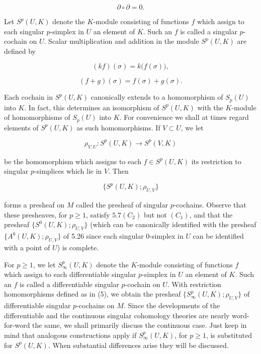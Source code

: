\begin{equation}
\tag{3}\label{eq:5.31:3}
\partial\circ\partial=0.
\end{equation}

Let $S^{p}(U,K)$ denote the $K$-module consisting of functions $f$ which assign to each singular $p$-simplex in $U$ an element of $K$. Such an $f$ is called a singular $p$-cochain on $U$. Scalar multiplication and addition in the module $S^{p}(U,K)$ are defined by

\[
(k f)(\sigma)=k\big(f(\sigma)\big),
\]

\begin{equation}
\tag{4}\label{eq:5.31:4}
(f+g)(\sigma)=f(\sigma)+g(\sigma).
\end{equation}

Each cochain in $S^{p}(U,K)$ canonically extends to a homomorphism of $S_{p}(U)$ into $K$. In fact, this determines an isomorphism of $S^{p}(U,K)$ with the $K$-module of homomorphisms of $S_{p}(U)$ into $K$. For convenience we shall at times regard elements of $S^{p}(U,K)$ as such homomorphisms. If $V\subset U$, we let

\begin{equation}
\tag{5}\label{eq:5.31:5}
\rho_{V,U}\colon S^{p}(U,K)\to S^{p}(V,K)
\end{equation}

be the homomorphism which assigns to each $f \in S^p(U,K)$ its restriction to singular $p$-simplices which lie in $V$. Then

\begin{equation}
\tag{6}\label{eq:5.31:6}
\{S^{p}(U,K);\rho_{U,V}\}
\end{equation}

forms a presheaf on $M$ called the presheaf of singular $p$-cochains. Observe that these presheaves, for $p \geq 1$, satisfy $5.7(C_2)$ but not $(C_1)$, and that the presheaf $\{S^0(U,K);\rho_{U,V}\}$ (which can be canonically identified with the presheaf $\{A^0(U,K);\rho_{U,V}\}$ of 5.26 since each singular 0-simplex in $U$ can be identified with a point of $U$) is complete.

For $p \geq 1$, we let $S_{\infty}^{p}(U,K)$ denote the $K$-module consisting of functions $f$ which assign to each differentiable singular $p$-simplex in $U$ an element of $K$. Such an $f$ is called a differentiable singular $p$-cochain on $U$. With restriction homomorphisms defined as in (5), we obtain the presheaf $\{S_{\infty}^{p}(U,K); \rho_{U,V}\}$ of differentiable singular $p$-cochains on $M$. Since the developments of the differentiable and the continuous singular cohomology theories are nearly word-for-word the same, we shall primarily discuss the continuous case. Just keep in mind that analogous constructions apply if $S_{\infty}^{p}(U,K)$, for $p \geq 1$, is substituted for $S^{p}(U,K)$. When substantial differences arise they will be discussed.

